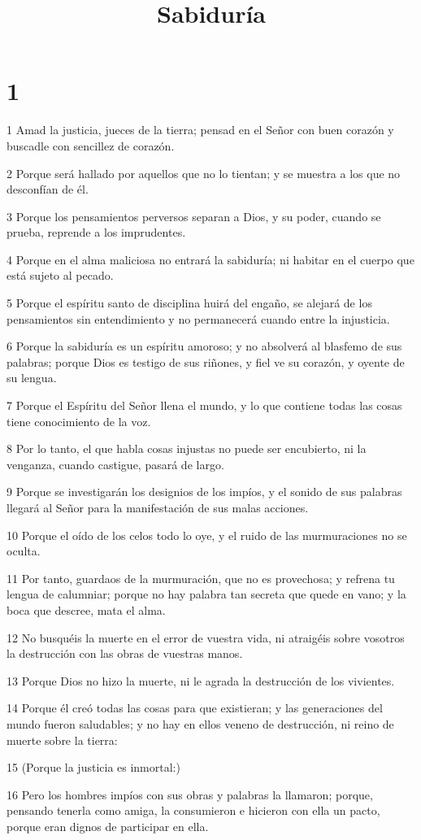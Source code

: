 

\title{Sabiduría}


\chapter{1}

\par 1 Amad la justicia, jueces de la tierra; pensad en el Señor con buen corazón y buscadle con sencillez de corazón.
\par 2 Porque será hallado por aquellos que no lo tientan; y se muestra a los que no desconfían de él.
\par 3 Porque los pensamientos perversos separan a Dios, y su poder, cuando se prueba, reprende a los imprudentes.
\par 4 Porque en el alma maliciosa no entrará la sabiduría; ni habitar en el cuerpo que está sujeto al pecado.
\par 5 Porque el espíritu santo de disciplina huirá del engaño, se alejará de los pensamientos sin entendimiento y no permanecerá cuando entre la injusticia.
\par 6 Porque la sabiduría es un espíritu amoroso; y no absolverá al blasfemo de sus palabras; porque Dios es testigo de sus riñones, y fiel ve su corazón, y oyente de su lengua.
\par 7 Porque el Espíritu del Señor llena el mundo, y lo que contiene todas las cosas tiene conocimiento de la voz.
\par 8 Por lo tanto, el que habla cosas injustas no puede ser encubierto, ni la venganza, cuando castigue, pasará de largo.
\par 9 Porque se investigarán los designios de los impíos, y el sonido de sus palabras llegará al Señor para la manifestación de sus malas acciones.
\par 10 Porque el oído de los celos todo lo oye, y el ruido de las murmuraciones no se oculta.
\par 11 Por tanto, guardaos de la murmuración, que no es provechosa; y refrena tu lengua de calumniar; porque no hay palabra tan secreta que quede en vano; y la boca que descree, mata el alma.
\par 12 No busquéis la muerte en el error de vuestra vida, ni atraigéis sobre vosotros la destrucción con las obras de vuestras manos.
\par 13 Porque Dios no hizo la muerte, ni le agrada la destrucción de los vivientes.
\par 14 Porque él creó todas las cosas para que existieran; y las generaciones del mundo fueron saludables; y no hay en ellos veneno de destrucción, ni reino de muerte sobre la tierra:
\par 15 (Porque la justicia es inmortal:)
\par 16 Pero los hombres impíos con sus obras y palabras la llamaron; porque, pensando tenerla como amiga, la consumieron e hicieron con ella un pacto, porque eran dignos de participar en ella.

